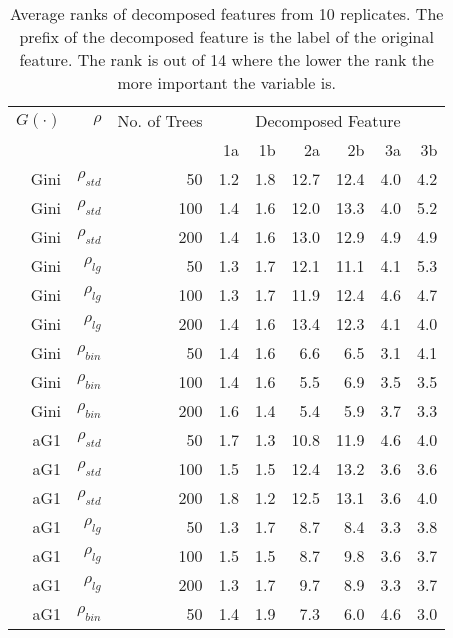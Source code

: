 \documentclass[twoside,11pt]{article}
\begin{document}
 \begin{table}%
  \centering
  \caption{Average ranks of decomposed features from 10 replicates. The prefix of the decomposed feature is the label of the original feature. The rank is out of 14 where the lower the rank the more important the variable is.}
\begin{tabular}{rrrrrrrrr}
\hline
$G(\cdot)$ & $\rho$ & No. of Trees & \multicolumn{6}{c}{Decomposed Feature}\\
 &  &  &  1a &  1b &  2a &  2b &  3a &  3b \bigstrut\\
\hline
Gini     & $\rho_{std}$ & 50    & 1.2   & 1.8   & 12.7  & 12.4  & 4.0   & 4.2 \bigstrut[t]\\
Gini     & $\rho_{std}$ & 100   & 1.4   & 1.6   & 12.0  & 13.3  & 4.0   & 5.2 \\
Gini  & $\rho_{std}$ & 200   & 1.4   & 1.6   & 13.0  & 12.9  & 4.9   & 4.9 \bigstrut[b]\\
\hline
Gini     & $\rho_{lg}$ & 50    & 1.3   & 1.7   & 12.1  & 11.1  & 4.1   & 5.3 \bigstrut[t]\\
Gini     & $\rho_{lg}$ & 100   & 1.3   & 1.7   & 11.9  & 12.4  & 4.6   & 4.7 \\
Gini     & $\rho_{lg}$ & 200   & 1.4   & 1.6   & 13.4  & 12.3  & 4.1   & 4.0 \bigstrut[b]\\
\hline
Gini     & $\rho_{bin}$ & 50    & 1.4   & 1.6   & 6.6   & 6.5   & 3.1   & 4.1 \bigstrut[t]\\
Gini     & $\rho_{bin}$ & 100   & 1.4   & 1.6   & 5.5   & 6.9   & 3.5   & 3.5 \\
Gini     & $\rho_{bin}$ & 200   & 1.6   & 1.4   & 5.4   & 5.9   & 3.7   & 3.3 \bigstrut[b]\\
\hline
aG1   & $\rho_{std}$ & 50    & 1.7   & 1.3   & 10.8  & 11.9  & 4.6   & 4.0 \bigstrut[t]\\
aG1   & $\rho_{std}$ & 100   & 1.5   & 1.5   & 12.4  & 13.2  & 3.6   & 3.6 \\
aG1   & $\rho_{std}$ & 200   & 1.8   & 1.2   & 12.5  & 13.1  & 3.6   & 4.0 \bigstrut[b]\\
\hline
aG1   & $\rho_{lg}$ & 50    & 1.3   & 1.7   & 8.7   & 8.4   & 3.3   & 3.8 \bigstrut[t]\\
aG1   & $\rho_{lg}$ & 100   & 1.5   & 1.5   & 8.7   & 9.8   & 3.6   & 3.7 \\
aG1   & $\rho_{lg}$ & 200   & 1.3   & 1.7   & 9.7   & 8.9   & 3.3   & 3.7 \bigstrut[b]\\
\hline
aG1   & $\rho_{bin}$ & 50    & 1.4   & 1.9   & 7.3   & 6.0   & 4.6   & 3.0 \bigstrut[t]\\

\end{tabular}
\end{table}
\end{document}
